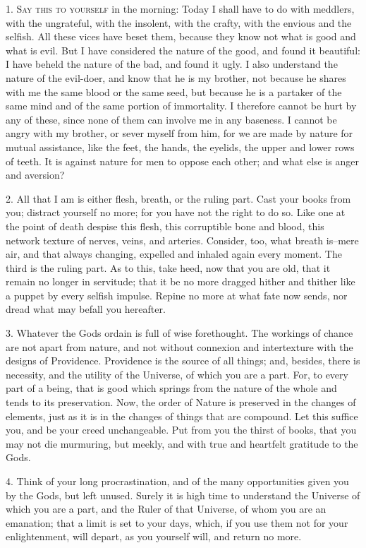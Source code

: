 \documentclass{book}
\begin{document}
1. \textsc{Say this to yourself} in the morning: Today I shall have
to do with meddlers, with the ungrateful, with the insolent, with the
crafty, with the envious and the selfish. All these vices have beset
them, because they know not what is good and what is evil. But I have
considered the nature of the good, and found it beautiful: I have
beheld the nature of the bad, and found it ugly. I also understand the
nature of the evil-doer, and know that he is my brother, not because
he shares with me the same blood or the same seed, but because he is
a partaker of the same mind and of the same portion of immortality. I
therefore cannot be hurt by any of these, since none of them can involve
me in any baseness. I cannot be angry with my brother, or sever myself
from him, for we are made by nature for mutual assistance, like the
feet, the hands, the eyelids, the upper and lower rows of teeth. It is
against nature for men to oppose each other; and what else is anger and
aversion?

2. All that I am is either flesh, breath, or the ruling part. Cast
your books from you; distract yourself no more; for you have not the
right to do so. Like one at the point of death despise this flesh,
this corruptible bone and blood, this network texture of nerves,
veins, and arteries. Consider, too, what breath is--mere air, and
that always changing, expelled and inhaled again every moment. The
third is the ruling part. As to this, take heed, now that you are old,
that it remain no longer in servitude; that it be no more dragged
hither and thither like a puppet by every selfish impulse. Repine no
more at what fate now sends, nor dread what may befall you hereafter.

3. Whatever the Gods ordain is full of wise forethought. The workings
of chance are not apart from nature, and not without connexion and
intertexture with the designs of Providence. Providence is the source
of all things; and, besides, there is necessity, and the utility of
the Universe, of which you are a part. For, to every part of a being,
that is good which springs from the nature of the whole and tends to
its preservation. Now, the order of Nature is preserved in the changes
of elements, just as it is in the changes of things that are
compound. Let this suffice you, and be your creed unchangeable. Put
from you the thirst of books, that you may not die murmuring, but
meekly, and with true and heartfelt gratitude to the Gods.

4. Think of your long procrastination, and of the many opportunities
given you by the Gods, but left unused. Surely it is high time to
understand the Universe of which you are a part, and the Ruler of that
Universe, of whom you are an emanation; that a limit is set to your
days, which, if you use them not for your enlightenment, will depart,
as you yourself will, and return no more.
\end{document}

